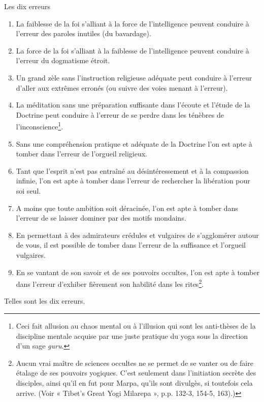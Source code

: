 \documentclass[10pt]{book}
\makeatletter
\renewcommand{\section}{\@startsection{section}{0}{0mm}
   {\baselineskip}
   {\baselineskip}{\normalfont\normalsize\scshape\centering}
}
\makeatother
\begin{document}
\section{Les dix erreurs}
\begin{enumerate}[1.-]
\item La faiblesse de la foi s'alliant à la force de l'intelligence peuvent conduire à l'erreur des paroles inutiles (du bavardage).
\item La force de la foi s'alliant à la faiblesse de l'intelligence peuvent conduire à l'erreur du dogmatisme étroit.
\item Un grand zèle sans l'instruction religieuse adéquate peut conduire à l'erreur d'aller aux extrêmes erronés (ou suivre des voies menant à l'erreur).
\item La méditation sans une préparation suffisante dans l'écoute et l'étude de la Doctrine peut conduire à l'erreur de se perdre dans les ténèbres de l'inconscience\footnote{Ceci fait allusion au chaos mental ou à l'illusion qui sont les anti-thèses de la discipline mentale acquise par une juste pratique du yoga sous la direction d'un sage \textit{guru}.}.
\item Sans une compréhension pratique et adéquate de la Doctrine l'on est apte à tomber dans l'erreur de l'orgueil religieux.
\item Tant que l'esprit n'est pas entraîné au désintéressement et à la compassion infinie, l'on est apte à tomber dans l'erreur de rechercher la libération pour soi seul.
\item A moins que toute ambition soit déracinée, l'on est apte à tomber dans l'erreur de se laisser dominer par des motifs mondains.
\item En permettant à des admirateurs crédules et vulgaires de s'agglomérer autour de vous, il est possible de tomber dans l'erreur de la suffisance et l'orgueil vulgaires.
\item En se vantant de son savoir et de ses pouvoirs occultes, l'on est apte à tomber dans l'erreur d'exhiber fièrement son habilité dans les rites\footnote{Aucun vrai maître de sciences occultes ne se permet de se vanter ou de faire étalage de ses pouvoirs yogiques. C'est seulement dans l'initiation secrète des disciples, ainsi qu'il en fut pour Marpa, qu'ils sont divulgès, si toutefois cela arrive. (Voir « Tibet's Great Yogi Milarepa », p.p. 132-3, 154-5, 163).)}.
\end{enumerate}
Telles sont les dix erreurs.
\end{document}
